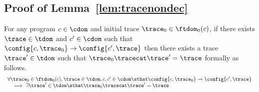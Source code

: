 
  

  \subsection{Proof of Lemma~\ref{lem:tracenondec}}
  \label{apdx:tracenondec}
  \begin{lemma}
    For any program $c \in \cdom$ and initial trace $\trace_0 \in \ftdom_0(c)$,
    if there exists $\trace \in \tdom$ and $c' \in \cdom $ such that $\config{c, \trace_0} \rightarrow \config{c', \trace} $
    then there exists a trace $\trace' \in \tdom$ such that $\trace_0 \tracecat \trace' = \trace$ formally as follows.
    \[
      \begin{array}{l}
      \forall \trace_0 \in \ftdom_0(c), \trace \in \tdom, c, c' \in \cdom \sthat
        \config{c, \trace_0} \rightarrow \config{c', \trace} 
      \\ \quad
      \implies \exists \trace' \in \tdom \sthat \trace_0 \tracecat \trace' = \trace 
      \end{array}
    \]
    \end{lemma}
